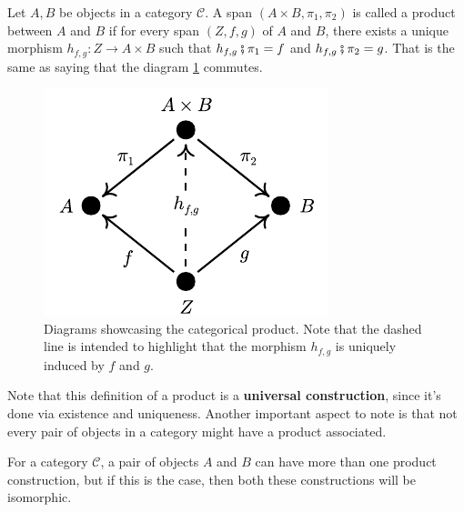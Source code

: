 \begin{definition}
  Let $A,B$ be objects in a  category $\mathcal C$. A span $(A\times B, \pi_1, \pi_2)$
  is called a product between $A$ and $B$ if for every span $(Z, f, g)$ of $A$ and $B$,
  there exists a unique morphism $h_{f,g}:Z \to A \times B$ such that
  $h_{f,g} \fatsemi \pi_1 = f$ and $h_{f,g} \fatsemi \pi_2 = g$. That is the same
  as saying that the diagram \ref{fig:Product} commutes.
\end{definition}

\begin{figure}[H]
  \begin{center}
    \includegraphics{./notebooks/CategoricalProduct.pdf}
  \end{center}
  \caption{Diagrams showcasing the categorical product. Note that the dashed line
  is intended to highlight that the morphism $h_{f,g}$ is uniquely induced by $f$ and $g$.}
  \label{fig:Product}
\end{figure}

Note that this definition of a product is a \textbf{universal construction}, since
it's done via existence and uniqueness.
Another important aspect to note is that not every pair of objects in a category might have a
product associated.

\begin{theorem}
  For a category $\mathcal C$, a pair of objects $A$ and $B$ can have more than one
  product construction, but if this is the case, then both these constructions will be
  isomorphic.
\end{theorem}

